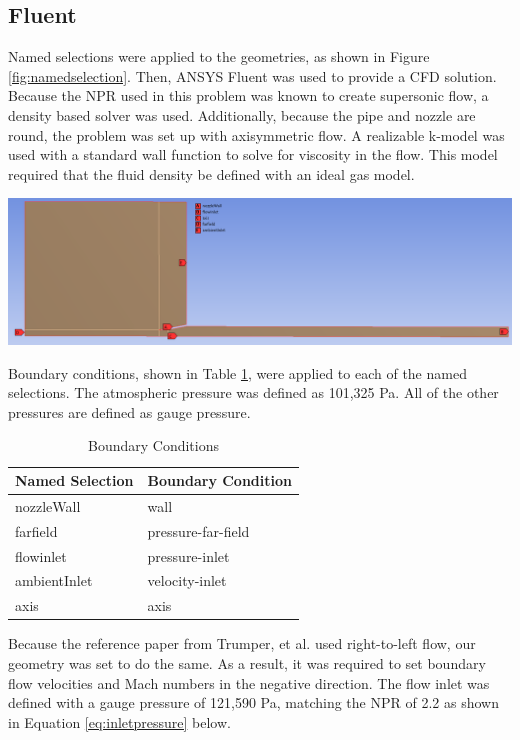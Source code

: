 \documentclass[12pt]{article} %
\begin{document}
\subsection{Fluent}\label{section:fluent}
Named selections were applied to the geometries, as shown in Figure \ref{fig:namedselection}. Then, ANSYS Fluent was used to provide a CFD solution. Because the NPR used in this problem was known to create supersonic flow, a density based solver was used. Additionally, because the pipe and nozzle are round, the problem was set up with axisymmetric flow. A realizable k-\textepsilon\:model was used with a standard wall function to solve for viscosity in the flow. This model required that the fluid density be defined with an ideal gas model.

\begin{center}
    \includegraphics[width = \linewidth]{Named_Selections.PNG}
    \label{fig:namedselection}
\end{center}

Boundary conditions, shown in Table \ref{tab:boundary}, were applied to each of the named selections. The atmospheric pressure was defined as 101,325 Pa. All of the other pressures are defined as gauge pressure.

\begin{table}[ht]
    \caption{Boundary Conditions}
    \centering
    \begin{tabular}{l|l}
        Named Selection&Boundary Condition\\
        \hline
        nozzleWall&wall\\
        farfield&pressure-far-field\\
        flowinlet&pressure-inlet\\
        ambientInlet&velocity-inlet\\
        axis&axis\\
        \hline
    \end{tabular}
    \label{tab:boundary}
\end{table}

Because the reference paper from Trumper, et al. used right-to-left flow, our geometry was set to do the same. As a result, it was required to set boundary flow velocities and Mach numbers in the negative direction. The flow inlet was defined with a gauge pressure of 121,590 Pa, matching the NPR of 2.2 as shown in Equation \ref{eq:inletpressure} below.
\end{document}
